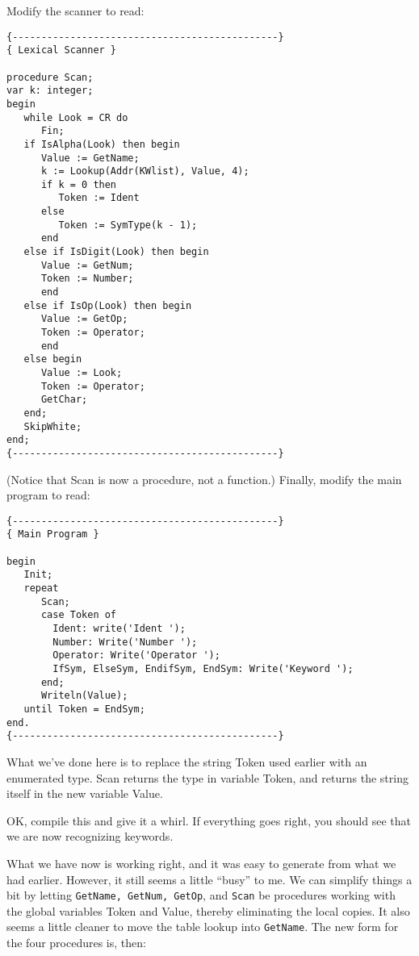 Modify the scanner to read:

\begin{verbatim}
{----------------------------------------------}
{ Lexical Scanner }

procedure Scan;
var k: integer;
begin
   while Look = CR do
      Fin;
   if IsAlpha(Look) then begin
      Value := GetName;
      k := Lookup(Addr(KWlist), Value, 4);
      if k = 0 then
         Token := Ident
      else
         Token := SymType(k - 1);
      end
   else if IsDigit(Look) then begin
      Value := GetNum;
      Token := Number;
      end
   else if IsOp(Look) then begin
      Value := GetOp;
      Token := Operator;
      end
   else begin
      Value := Look;
      Token := Operator;
      GetChar;
   end;
   SkipWhite;
end;
{----------------------------------------------}
\end{verbatim}

(Notice that Scan is now a procedure, not a function.)
Finally, modify the main program to read:

\begin{verbatim}
{----------------------------------------------}
{ Main Program }

begin
   Init;
   repeat
      Scan;
      case Token of
        Ident: write('Ident ');
        Number: Write('Number ');
        Operator: Write('Operator ');
        IfSym, ElseSym, EndifSym, EndSym: Write('Keyword ');
      end;
      Writeln(Value);
   until Token = EndSym;
end.
{----------------------------------------------}
\end{verbatim}

What we've done here is to replace the string Token  used earlier with an enumerated type. Scan returns the type in variable Token, and returns the string itself in the new variable Value.

OK, compile this and give it a whirl. If everything  goes right, you should see that we are now recognizing keywords.

What  we  have  now is working right, and it was easy to generate from what  we  had  earlier. However, it still seems a little ``busy'' to me. We can  simplify  things a bit by letting {\tt GetName, GetNum, GetOp}, and {\tt Scan} be  procedures  working  with  the global variables Token and Value, thereby eliminating the  local copies. It  also seems a little cleaner to move  the  table  lookup  into {\tt GetName}. The new form for the four procedures is, then:

